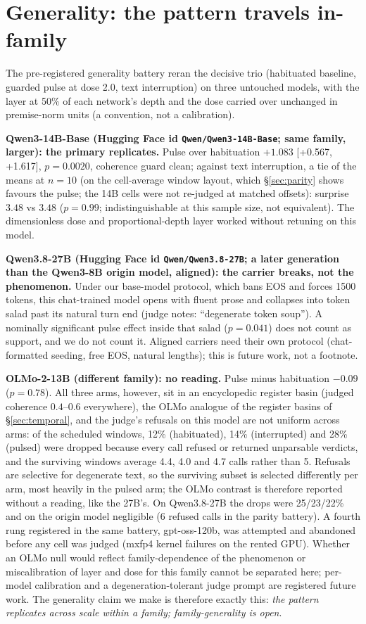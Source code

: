 \documentclass[11pt]{article}
\newcommand{\ci}[2]{[#1,\,#2]}
\begin{document}
\section{Generality: the pattern travels in-family}
\label{sec:generality}

The pre-registered generality battery reran the decisive trio
(habituated baseline, guarded pulse at dose 2.0, text interruption)
on three untouched models, with the layer at 50\% of each network's
depth and the dose carried over unchanged in premise-norm units (a
convention, not a calibration).

\textbf{Qwen3-14B-Base (Hugging Face id \texttt{Qwen/Qwen3-14B-Base};
same family, larger): the primary replicates.} Pulse
over habituation $+1.083$ \ci{+0.567}{+1.617}, $p=0.0020$, coherence
guard clean; against text interruption, a tie of the means at $n=10$
(on the cell-average window layout, which \S\ref{sec:parity} shows
favours the pulse; the 14B cells were not re-judged at matched offsets):
surprise $3.48$ vs $3.48$ ($p=0.99$; indistinguishable at this sample
size, not equivalent). The dimensionless dose and proportional-depth
layer worked without retuning on this model.

\textbf{Qwen3.8-27B (Hugging Face id \texttt{Qwen/Qwen3.8-27B}; a
later generation than the Qwen3-8B origin model, aligned): the carrier
breaks, not the phenomenon.} Under our base-model protocol, which bans EOS
and forces 1500 tokens, this chat-trained model opens with fluent
prose and collapses into token salad past its natural turn end
(judge notes: ``degenerate token soup''). A nominally significant
pulse effect inside that salad ($p=0.041$) does not count as support,
and we do not count it. Aligned carriers need their own protocol
(chat-formatted seeding, free EOS, natural lengths); this is future
work, not a footnote.

\textbf{OLMo-2-13B (different family): no reading.} Pulse minus
habituation $-0.09$ ($p=0.78$). All three arms, however, sit in an
encyclopedic register basin (judged coherence $0.4$--$0.6$ everywhere),
the OLMo analogue of the register basins of \S\ref{sec:temporal}, and
the judge's refusals on this model are not uniform across arms: of the
scheduled windows, 12\% (habituated), 14\% (interrupted) and 28\%
(pulsed) were dropped because every call refused or returned unparsable
verdicts, and the surviving windows average 4.4, 4.0 and 4.7 calls
rather than 5. Refusals are selective for degenerate text, so the
surviving subset is selected differently per arm, most heavily in the
pulsed arm; the OLMo contrast is therefore reported without a reading,
like the 27B's. On Qwen3.8-27B the drops were 25/23/22\% and on the
origin model negligible (6 refused calls in the parity battery). A
fourth rung registered in the same battery, gpt-oss-120b, was attempted
and abandoned before any cell was judged (mxfp4 kernel failures on the
rented GPU). Whether an OLMo null would reflect family-dependence of
the phenomenon or miscalibration of layer and dose for this family
cannot be separated here; per-model calibration and a
degeneration-tolerant judge prompt are registered future work. The
generality claim we make is therefore exactly this: \emph{the pattern
replicates across scale within a family; family-generality is open}.
\end{document}

